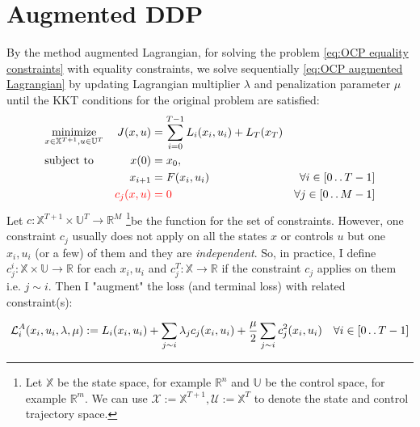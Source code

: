 \documentclass{report}
\newcommand{\twodots}{\mathinner {\ldotp \ldotp}}
\begin{document}
\section{Augmented DDP}
By the method augmented Lagrangian, for solving the problem \ref{eq:OCP equality constraints} with equality constraints, we solve sequentially \ref{eq:OCP augmented Lagrangian} by updating Lagrangian multiplier $\lambda$ and penalization parameter $\mu$ until the KKT conditions for the original problem are satisfied:
\begin{equation}
\label{eq:OCP equality constraints}
\begin{aligned}
&\underset{x \in \mathbb{X}^{T+1}, u \in \mathbb{U}^T}{\text{minimize}}          &J(x, u) &=\sum_{i = 0}^{T-1} L_i(x_i, u_i) + L_T(x_T) & \\
&\text{subject to}       &x(0)      &= x_0,  & \\ %
&				  &x_{i+1}  &= F(x_i, u_i)  &\forall i \in [0 \twodots T-1] \\
&	&\color{red} c_j(x, u) &\color{red} = 0 &\forall j \in [0 \twodots M-1]
\end{aligned}
\end{equation}
Let $c : \mathbb{X}^{T+1} \times \mathbb{U}^T \rightarrow \mathbb{R}^M$ \footnote{Let $\mathbb{X}$ be the state space, for example $\mathbb{R}^n$ and $\mathbb{U}$ be the control space, for example $\mathbb{R}^m$. We can use $\mathcal{X} := \mathbb{X}^{T+1}, \mathcal{U}:= \mathbb{X}^T$ to denote the state and control trajectory space.}be the function for the set of constraints. However, one constraint $c_j$ usually does not apply on all the states $x$ or controls $u$ but one $x_i, u_i$ (or a few) of them and they are \emph{independent}. So, in practice, I define $c_j^i : \mathbb{X} \times \mathbb{U} \rightarrow \mathbb{R}$ for each $x_i, u_i$ and $c_j^T : \mathbb{X} \rightarrow \mathbb{R}$ if the constraint $c_j$ applies on them i.e. $j \sim i$. Then I "augment" the loss (and terminal loss) with related constraint(s): 
\begin{tcolorbox}
\begin{equation}
\mathcal{L}^A_i(x_i, u_i, \lambda, \mu) := L_i(x_i, u_i) 
+ \sum_{j \sim i}\lambda_j c_j(x_i, u_i) + \frac{\mu}{2} \sum_{j \sim i} c_j^2(x_i, u_i) \quad \forall i \in [0 \twodots T-1]
\end{equation}
\end{tcolorbox}
\end{document}
